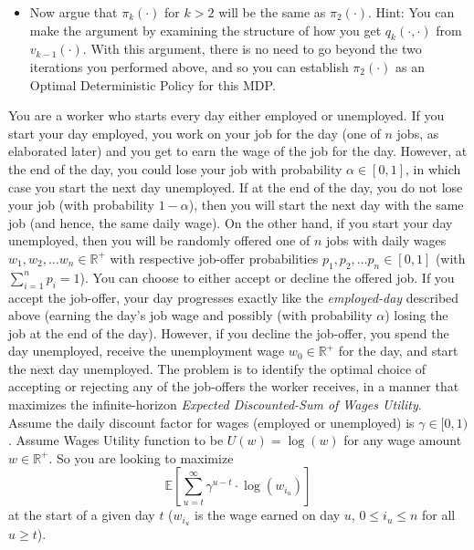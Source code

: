 \documentclass[12pt]{exam}
\begin{document}
\begin{questions}
\begin{itemize}
	\item Now argue that $\pi_k(\cdot)$ for $k > 2$ will be the same as $\pi_2(\cdot)$. Hint: You can make the argument by examining the structure of how you get $q_k(\cdot, \cdot)$ from $v_{k-1}(\cdot)$. With this argument, there is no need to go beyond the two iterations you performed above, and so you can establish $\pi_2(\cdot)$ as an Optimal Deterministic Policy for this MDP.
\end{itemize}

 You are a worker who starts every day either employed or unemployed. If you start your day employed, you work on your job for the day (one of $n$ jobs, as elaborated later) and you get to earn the wage of the job for the day. However, at the end of the day, you could lose your job with probability $\alpha \in [0,1]$, in which case you start the next day unemployed. If at the end of the day, you do not lose your job (with probability $1-\alpha$), then you will start the next day with the same job (and hence, the same daily wage). On the other hand, if you start your day unemployed, then you will be randomly offered one of $n$ jobs with daily wages $w_1, w_2, \ldots w_n \in \mathbb{R}^+$ with respective job-offer probabilities $p_1, p_2, \ldots p_n \in [0,1]$ (with $\sum_{i=1}^n p_i = 1$). You can choose to either accept or decline the offered job. If you accept the job-offer, your day progresses exactly like the {\em employed-day} described above (earning the day's job wage and possibly (with probability $\alpha$) losing the job at the end of the day). However, if you decline the job-offer, you spend the day unemployed, receive the unemployment wage $w_0 \in \mathbb{R}^+$ for the day, and start the next day unemployed. The problem is to identify the optimal choice of accepting or rejecting any of the job-offers the worker receives, in a manner that maximizes the infinite-horizon {\em Expected Discounted-Sum of Wages Utility}. Assume the daily discount factor for wages (employed or unemployed) is $\gamma \in [0,1)$. Assume Wages Utility function to be $U(w) = \log(w)$ for any wage amount $w \in \mathbb{R}^+$. So you are looking to maximize
$$\mathbb{E}[\sum_{u=t}^\infty \gamma^{u-t} \cdot \log(w_{i_u})]$$
at the start of a given day $t$ ($w_{i_u}$ is the wage earned on day $u$, $0\leq i_u \leq n$ for all $u\geq t$).


\end{questions}
\end{document}
